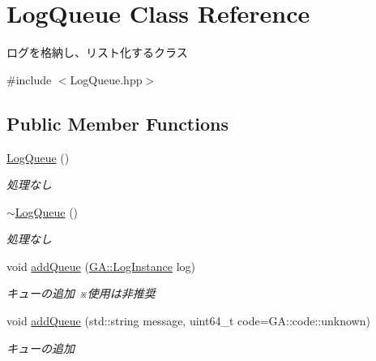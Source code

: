 \hypertarget{class_log_queue}{}\section{Log\+Queue Class Reference}
\label{class_log_queue}


ログを格納し、リスト化するクラス  




{\ttfamily \#include $<$Log\+Queue.\+hpp$>$}

\subsection*{Public Member Functions}
\begin{DoxyCompactItemize}
\item 
\mbox{\label{class_log_queue_a819b9467d4a7b368cb60f8a9f90cdc85}} 
\mbox{\hyperlink{class_log_queue_a819b9467d4a7b368cb60f8a9f90cdc85}{Log\+Queue}} ()
\begin{DoxyCompactList}\small\item\em 処理なし \end{DoxyCompactList}\item 
\mbox{\label{class_log_queue_a87faedeaddc1f268f3ec52d0068a9780}} 
\mbox{\hyperlink{class_log_queue_a87faedeaddc1f268f3ec52d0068a9780}{$\sim$\+Log\+Queue}} ()
\begin{DoxyCompactList}\small\item\em 処理なし \end{DoxyCompactList}\item 
\mbox{\label{class_log_queue_a9e17310378f23882588d6af0d8929710}} 
void \mbox{\hyperlink{class_log_queue_a9e17310378f23882588d6af0d8929710}{add\+Queue}} (\mbox{\hyperlink{class_g_a_1_1_log_instance}{G\+A\+::\+Log\+Instance}} log)
\begin{DoxyCompactList}\small\item\em キューの追加 ※使用は非推奨 \end{DoxyCompactList}\item 
\mbox{\label{class_log_queue_a96a85394648bf0d7cdc7e5db72c260f0}} 
void \mbox{\hyperlink{class_log_queue_a96a85394648bf0d7cdc7e5db72c260f0}{add\+Queue}} (std\+::string message, uint64\+\_\+t code=G\+A\+::code\+::unknown)
\begin{DoxyCompactList}\small\item\em キューの追加 \end{DoxyCompactList}\item 

\end{DoxyCompactItemize}
